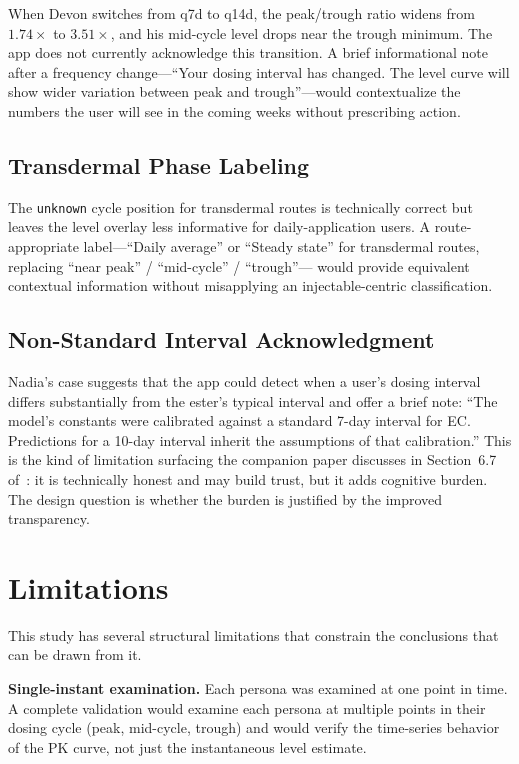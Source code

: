 \documentclass[11pt,a4paper]{article}
\newcommand{\code}[1]{\texttt{\small #1}}
\begin{document}
When Devon switches from q7d to q14d, the peak/trough ratio widens from
$1.74\times$ to $3.51\times$, and his mid-cycle level drops near the trough
minimum. The app does not currently acknowledge this transition. A brief
informational note after a frequency change---``Your dosing interval has
changed. The level curve will show wider variation between peak and
trough''---would contextualize the numbers the user will see in the coming
weeks without prescribing action.

\subsection{Transdermal Phase Labeling}

The \code{unknown} cycle position for transdermal routes is technically
correct but leaves the level overlay less informative for daily-application
users. A route-appropriate label---``Daily average'' or ``Steady state'' for
transdermal routes, replacing ``near peak'' / ``mid-cycle'' / ``trough''---
would provide equivalent contextual information without misapplying an
injectable-centric classification.

\subsection{Non-Standard Interval Acknowledgment}

Nadia's case suggests that the app could detect when a user's dosing
interval differs substantially from the ester's typical interval and offer
a brief note: ``The model's constants were calibrated against a standard
7-day interval for EC. Predictions for a 10-day interval inherit the
assumptions of that calibration.'' This is the kind of limitation surfacing
the companion paper discusses in Section~6.7 of~\cite{xtux}: it is
technically honest and may build trust, but it adds cognitive burden. The
design question is whether the burden is justified by the improved
transparency.

\section{Limitations}
\label{sec:limitations}

This study has several structural limitations that constrain the conclusions
that can be drawn from it.

\textbf{Single-instant examination.} Each persona was examined at one point
in time. A complete validation would examine each persona at multiple points
in their dosing cycle (peak, mid-cycle, trough) and would verify the
time-series behavior of the PK curve, not just the instantaneous level
estimate.
\end{document}
